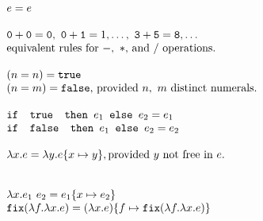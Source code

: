 \[
\begin{array}{lr}
e = e \\ \\
\texttt{0} + \texttt{0} = \texttt{0}, \ \texttt{0} + \texttt{1} = 1, \ldots, \ \texttt{3} + \texttt{5} = \texttt{8}, \ldots  \\
\text{equivalent rules for } -, \ * \text{, and } /\text{ operations.}
\\ \\
(n =n) = \texttt{true} \\ (n=m) = \texttt{false}\text{, provided } n, \ m \text{ distinct numerals.}\\ \\ 
\ifelse{\texttt{ true }}{e_1}{e_2} = e_1 \\
\ifelse{\texttt{ false }}{e_1}{e_2} = e_2 \\ \\ 
\lambda x.e = \lambda y.e\{x \mapsto y \}, \text{provided } y \text{ not free in } e. \\ \\ \\
\lambda x.e_1 \ e_2 = e_1\{x \mapsto e_2\} \\
\texttt{fix}(\lambda f. \lambda x.e) = (\lambda x.e)\{f \mapsto \texttt{fix}(\lambda f.\lambda x.e)\}
\end{array}
\]



